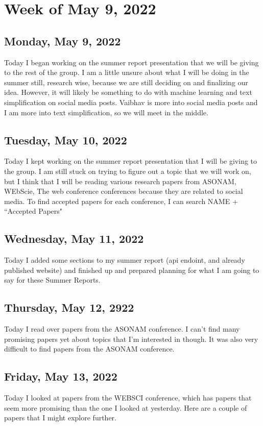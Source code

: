 \documentclass[11pt,letterpaper]{article}
\begin{document}
\section{Week of May 9, 2022}
\subsection{Monday, May 9, 2022}
Today I began working on the summer report presentation that we will be giving to the rest of the group. I am a little unsure about what I will be doing in the summer still, research wise, because we are still deciding on and finalizing our idea. However, it will likely be something to do with machine learning and text simplification on social media posts. Vaibhav is more into social media posts and I am more into text simplification, so we will meet in the middle.

\subsection{Tuesday, May 10, 2022}
Today I kept working on the summer report presentation that I will be giving to the group. I am still stuck on trying to figure out a topic that we will work on, but I think that I will be reading various research papers from ASONAM, WEbScie, The web conference conferences because they are related to social media. To find accepted papers for each conference, I can search NAME + ``Accepted Papers"

\subsection{Wednesday, May 11, 2022}
Today I added some sections to my summer report (api endoint, and already published website) and finished up and prepared planning for what I am going to say for these Summer Reports.

\subsection{Thursday, May 12, 2922}
Today I read over papers from the ASONAM conference. I can't find many promising papers yet about topics that I'm interested in though. It was also very difficult to find papers from the ASONAM conference.

\subsection{Friday, May 13, 2022}
Today I looked at papers from the WEBSCI conference, which has papers that seem more promising than the one I looked at yesterday. Here are a couple of papers that I might explore further.
\end{document}
